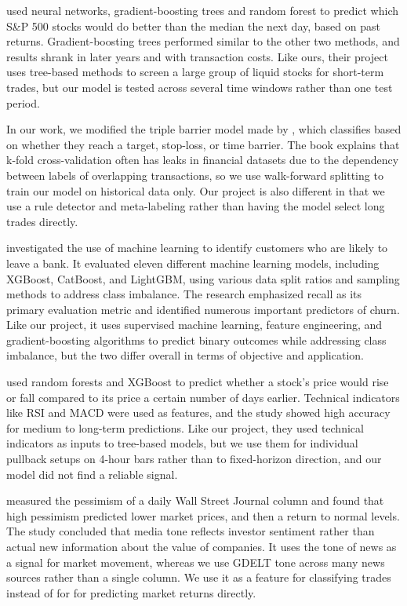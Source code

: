 \documentclass[11pt]{article}
\begin{document}
\citet{krauss2017deep} used neural networks, gradient-boosting trees and random forest to predict which S\&P 500 stocks would do better than the median the next day, based on past returns. Gradient-boosting trees performed similar to the other two methods, and results shrank in later years and with transaction costs. Like ours, their project uses tree-based methods to screen a large group of liquid stocks for short-term trades, but our model is tested across several time windows rather than one test period.

In our work, we modified the triple barrier model made by \citet{lopezdeprado2018advances}, which classifies based on whether they reach a target, stop-loss, or time barrier. The book explains that k-fold cross-validation often has leaks in financial datasets due to the dependency between labels of overlapping transactions, so we use walk-forward splitting to train our model on historical data only. Our project is also different in that we use a rule detector and meta-labeling rather than having the model select long trades directly.

\citet{zhuang2025machine} investigated the use of machine learning to identify customers who are likely to leave a bank. It evaluated eleven different machine learning models, including XGBoost, CatBoost, and LightGBM, using various data split ratios and sampling methods to address class imbalance. The research emphasized recall as its primary evaluation metric and identified numerous important predictors of churn. Like our project, it uses supervised machine learning, feature engineering, and gradient-boosting algorithms to predict binary outcomes while addressing class imbalance, but the two differ overall in terms of objective and application.

\citet{basak2019predicting} used random forests and XGBoost to predict whether a stock's price would rise or fall compared to its price a certain number of days earlier. Technical indicators like RSI and MACD were used as features, and the study showed high accuracy for medium to long-term predictions. Like our project, they used technical indicators as inputs to tree-based models, but we use them for individual pullback setups on 4-hour bars rather than to fixed-horizon direction, and our model did not find a reliable signal.

\citet{tetlock2007giving} measured the pessimism of a daily Wall Street Journal column and found that high pessimism predicted lower market prices, and then a return to normal levels. The study concluded that media tone reflects investor sentiment rather than actual new information about the value of companies. It uses the tone of news as a signal for market movement, whereas we use GDELT tone across many news sources rather than a single column. We use it as a feature for classifying trades instead of for for predicting market returns directly.
\end{document}

